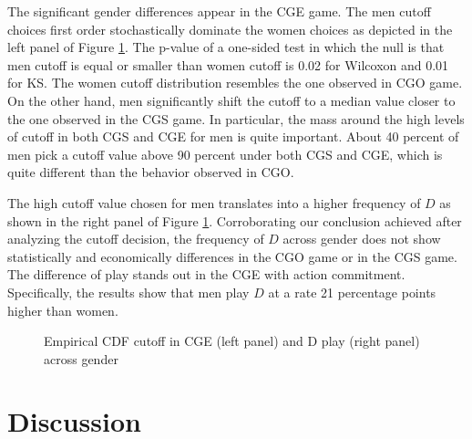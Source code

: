 \documentclass[12pt,english]{article}
\begin{document}
The significant gender differences appear in the CGE game. The men cutoff choices first order stochastically dominate the women choices as depicted in the left panel of Figure \ref{fig:cdfgender2}. The p-value of a one-sided test in which the null is that men cutoff is equal or smaller than women cutoff is 0.02 for Wilcoxon and 0.01 for KS. The women cutoff distribution resembles the one observed in CGO game. On the other hand, men significantly shift the cutoff to a median value closer to the one observed in the CGS game. In particular, the mass around the high levels of cutoff in both CGS and CGE for men is quite important. About 40 percent of men pick a cutoff value above 90 percent under both CGS and CGE, which is quite different than the behavior observed in CGO. 

The high cutoff value chosen for men translates into a higher frequency of $D$ as shown in the right panel of Figure \ref{fig:cdfgender2}. Corroborating our conclusion achieved after analyzing the cutoff decision, the frequency of $D$ across gender does not show statistically and economically differences in the CGO game or in the CGS game. The difference of play stands out in the CGE with action commitment. Specifically, the results show that men play $D$ at a rate 21 percentage points higher than women. 

\begin{center}
\begin{figure}[ht]
\centering{}%
\begin{minipage}[t]{0.45\columnwidth}%
%
\end{minipage}%
\begin{minipage}[t]{0.45\columnwidth}%
%
\end{minipage} 
\caption{Empirical CDF cutoff in CGE (left panel) and D play (right panel) across gender}
\label{fig:cdfgender2}\end{figure}
\par\end{center}

\section{Discussion}
\label{sec:discuss}
\end{document}
